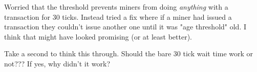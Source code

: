 \documentclass[letterpaper,11pt]{article}
\begin{document}
Worried that the threshold prevents miners from doing \textit{anything} with a transaction for 30 ticks. Instead tried a fix where if a miner had issued a transaction they couldn't issue another one until it was "age threshold" old. I think that might have looked promising (or at least better).

Take a second to think this through. Should the bare 30 tick wait time work or not??? If yes, why didn't it work?


\end{document}
